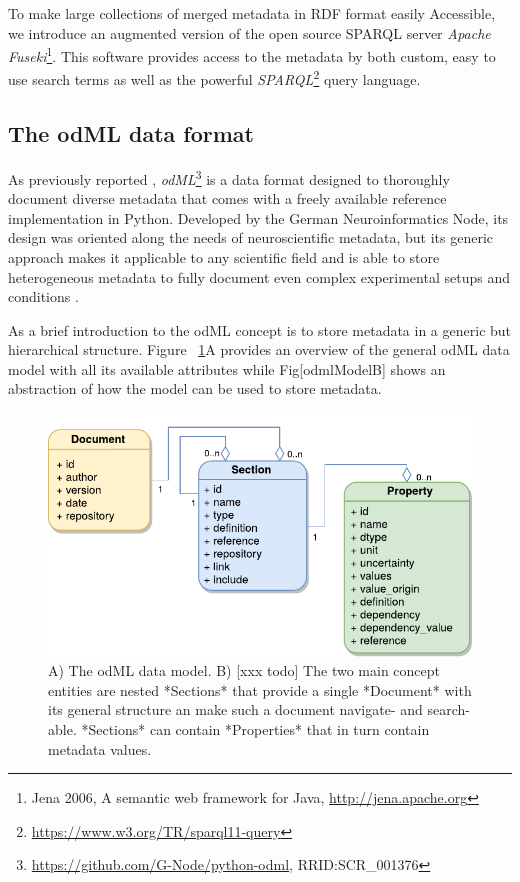 \documentclass{article}
\begin{document}
To make large collections of merged metadata in RDF format easily Accessible, we introduce an augmented version of the open source SPARQL server \textit{Apache Fuseki}\footnote{Jena 2006, A semantic web framework for Java, \url{http://jena.apache.org}}. This software provides access to the metadata by both custom, easy to use search terms as well as the powerful \textit{SPARQL}\footnote{\url{https://www.w3.org/TR/sparql11-query}} query language.

\subsection{The odML data format} \label{sec:odml_intro}
As previously reported \cite{Grewe_2011}, \textit{odML}\footnote{\url{https://github.com/G-Node/python-odml}, RRID:SCR\_001376} is a data format designed to thoroughly document diverse metadata that comes with a freely available reference implementation in Python. Developed by the German Neuroinformatics Node, its design was oriented along the needs of neuroscientific metadata, but its generic approach makes it applicable to any scientific field and is able to store heterogeneous metadata to fully document even complex experimental setups and conditions \cite{Zehl_2016}.

As a brief introduction to the odML concept is to store metadata in a generic but hierarchical structure. Figure ~\ref{fig:odmlModel}A provides an overview of the general odML data model with all its available attributes while Fig[odmlModelB] shows an abstraction of how the model can be used to store metadata.

\begin{figure}
\begin{center}
\includegraphics[width=0.70\columnwidth]{figures/figOdmlModelA.pdf}
\caption{
A) The odML data model. B) [xxx todo] The two main concept entities are nested *Sections* that provide a single *Document* with its general structure an make such a document navigate- and search-able. *Sections* can contain *Properties* that in turn contain metadata values.
}
\label{fig:odmlModel}
\end{center}
\end{figure}
\end{document}
